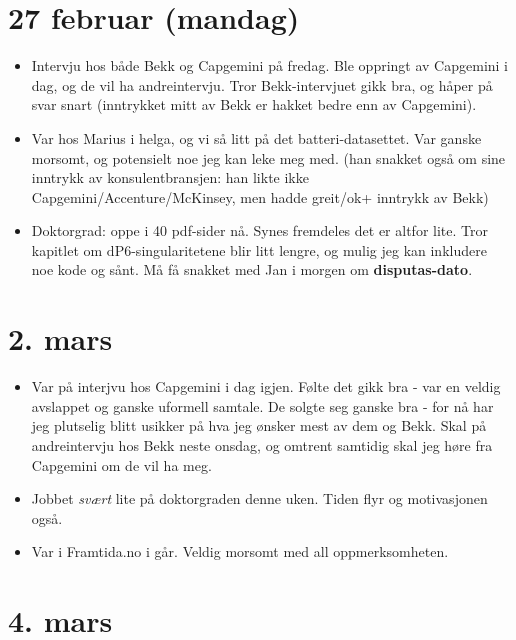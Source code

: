 \documentclass[11pt, norsk]{article}
\begin{document}
\section{27 februar (mandag)} %
\label{sec:27_februar}

\begin{itemize}
  \item Intervju hos både Bekk og Capgemini på fredag. Ble oppringt av Capgemini i dag, og de vil ha andreintervju. Tror Bekk-intervjuet gikk bra, og håper på svar snart (inntrykket mitt av Bekk er hakket bedre enn av Capgemini).
  \item Var hos Marius i helga, og vi så litt på det batteri-datasettet. Var ganske morsomt, og potensielt noe jeg kan leke meg med. (han snakket også om sine inntrykk av konsulentbransjen: han likte ikke Capgemini/Accenture/McKinsey, men hadde greit/ok+ inntrykk av Bekk)
  \item Doktorgrad: oppe i 40 pdf-sider nå. Synes fremdeles det er altfor lite. Tror kapitlet om $\mathrm{dP6}$-singularitetene blir litt lengre, og mulig jeg kan inkludere noe kode og sånt. Må få snakket med Jan i morgen om \textbf{disputas-dato}. 
\end{itemize}


\section{2. mars} %
\label{sec:2_mars}

\begin{itemize}
  \item Var på interjvu hos Capgemini i dag igjen. Følte det gikk bra - var en veldig avslappet og ganske uformell samtale. De solgte seg ganske bra - for nå har jeg plutselig blitt usikker på hva jeg ønsker mest av dem og Bekk. Skal på andreintervju hos Bekk neste onsdag, og omtrent samtidig skal jeg høre fra Capgemini om de vil ha meg.
  \item Jobbet \emph{svært} lite på doktorgraden denne uken. Tiden flyr og motivasjonen også.
  \item Var i Framtida.no i går. Veldig morsomt med all oppmerksomheten.
\end{itemize}


\section{4. mars} %
\label{sec:4_mars}
\end{document}
